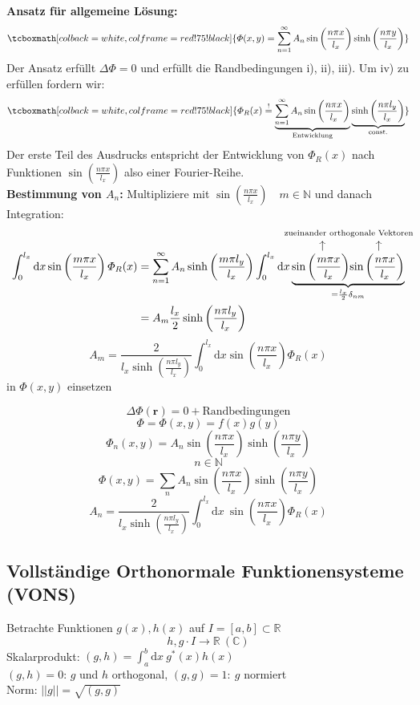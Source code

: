 \documentclass[titlepage,11pt,a4paper,ngerman]{report}
\newcommand{\tx}[1]{\textrm{#1}}
\newcommand{\const}{\tx{const.}}
\newcommand{\ub}[1]{\underbrace{#1}}
\newcommand{\dd}{\tx{d}}
\newcommand{\custoup}[3]{\overset{\scriptstyle\underset{\mkern4mu\rotatebox{-90}{$\hspace{-3pt} #1$}}{#3}}{#2}}
\renewcommand{\Phi}{\varPhi}
\newcommand{\intt}[2]{\int_{#1}^{#2}}
\renewcommand{\vec}[1]{\boldsymbol{#1}}
\newcommand{\rmbox}[1]{\tcboxmath[colback=white,colframe=red!75!black]{#1}}
\newcommand{\bbb}[2]{\begin{tcolorbox}[colback=white,colframe=black,fonttitle=\bfseries,title=#1,sharp corners,tcbox raise base]#2\end{tcolorbox}}
\begin{document}
\textbf{Ansatz für allgemeine Lösung:}
\begin{equation*}
\rmbox{\Phi(x,y) = \sum_{n=1}^{\infty} A_n \sin \left(\frac{n \pi x}{l_x}\right) \sinh \left(\frac{n \pi y}{l_x}\right)}
\end{equation*}
Der Ansatz erfüllt $ \Delta \Phi = 0 $ und erfüllt die Randbedingungen i), ii), iii). Um iv) zu erfüllen fordern wir:
\begin{equation*}
\rmbox{\Phi_R(x) \buildrel ! \over = \ub{\sum_{n=1}^{\infty} A_n \sin\left(\frac{n \pi x}{l_x}\right)}_{\tx{Entwicklung}} \ub{\sinh\left(\frac{n \pi l_y}{l_x}\right)}_{\const}}
\end{equation*}
Der erste Teil des Ausdrucks entspricht der Entwicklung von $ \Phi_R(x) $ nach Funktionen $ \sin \left(\frac{n \pi x}{l_x}\right) $ also einer Fourier-Reihe.\\[5pt]
\textbf{Bestimmung von $ A_n $:}
Multipliziere mit $ \sin\left(\frac{n \pi x}{l_x}\right) \quad m \in \mathbb{N} $ und danach Integration:
\begin{align*}
\int_{0}^{l_x} \dd x \sin\left(\frac{m \pi x}{l_x}\right) \Phi_R (x) &= \sum_{n=1}^{\infty} A_n \sinh\left(\frac{m \pi l_y}{l_x}\right) \int_{0}^{l_x} \dd x \ub{\custoup{\leftarrow}{\sin\left(\frac{m \pi x}{l_x}\right)}{\qquad \qquad \quad \mathclap{\tx{zueinander orthogonale Vektoren}}} \custoup{\leftarrow}{\sin\left(\frac{n \pi x}{l_x}\right)}{}}_{= \frac{l_x}{2} \delta_{nm}}\\
&= A_m \frac{l_x}{2} \sinh\left(\frac{n \pi l_y}{l_x}\right)
\end{align*}
\begin{equation*}
A_m = \frac{2}{l_x \sinh\left(\frac{n \pi l_y}{l_x}\right)} \int_{0}^{l_x} \dd x \sin \left(\frac{n \pi x}{l_x}\right) \Phi_R(x)
\end{equation*}
in $ \Phi(x,y) $ einsetzen\\[5pt]


\bbb{Wiederholung}{$$\Delta \Phi(\vec{r}) = 0 + \textrm{Randbedingungen}$$
$$\Phi = \Phi(x,y) = f(x)g(y)$$
$$\Phi_n(x,y) = A_n \sin\left(\frac{n \pi x}{l_x}\right) \sinh\left(\frac{n \pi y}{l_x}\right)$$
$$n \in \mathbb N$$
$$\Phi(x,y) = \sum_n A_n \sin\left(\frac{n \pi x}{l_x}\right) \sinh\left(\frac{n \pi y}{l_x}\right)$$
$$A_n = \frac{2}{l_x \sinh\left(\frac{n \pi l_y}{l_x}\right)} \intt{0}{l_x}\textrm{d}x\ \sin\left(\frac{n \pi x}{l_x}\right) \Phi_R (x)$$} %

\subsection{Vollständige Orthonormale Funktionensysteme (VONS)}
Betrachte Funktionen $g(x),h(x)$ auf $I = [a,b] \subset \mathbb R$
$$h,g \cdot I \to \mathbb R\ (\mathbb C)$$
Skalarprodukt: $(g,h) = \int_a^b \textrm{d}x\ g^* (x) h(x)$\\
$(g,h) = 0$: $g$ und $h$ orthogonal, $(g,g) = 1:\ g$ normiert\\
Norm: $||g|| = \sqrt{(g,g)}$
\end{document}
